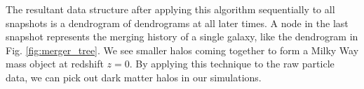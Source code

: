 The resultant data structure after applying this algorithm sequentially to all snapshots is  a dendrogram of dendrograms at all later times. A node in the last snapshot represents the merging history of a single galaxy, like the dendrogram in Fig. \ref{fig:merger_tree}. We see smaller halos coming together to form a Milky Way mass object at redshift $z=0$. By applying this technique to the raw particle data, we can pick out dark matter halos in our simulations.




